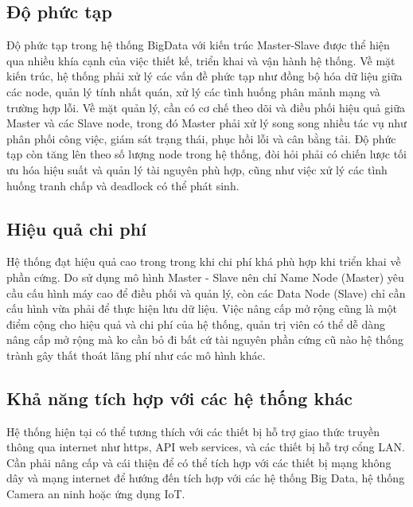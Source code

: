 \documentclass[../main.tex]{subfiles}
\begin{document}
\subsection{Độ phức tạp}
Độ phức tạp trong hệ thống BigData với kiến trúc Master-Slave được thể hiện qua nhiều khía cạnh của việc thiết kế, triển khai và vận hành hệ thống. Về mặt kiến trúc, hệ thống phải xử lý các vấn đề phức tạp như đồng bộ hóa dữ liệu giữa các node, quản lý tính nhất quán, xử lý các tình huống phân mảnh mạng và trường hợp lỗi. Về mặt quản lý, cần có cơ chế theo dõi và điều phối hiệu quả giữa Master và các Slave node, trong đó Master phải xử lý song song nhiều tác vụ như phân phối công việc, giám sát trạng thái, phục hồi lỗi và cân bằng tải. Độ phức tạp còn tăng lên theo số lượng node trong hệ thống, đòi hỏi phải có chiến lược tối ưu hóa hiệu suất và quản lý tài nguyên phù hợp, cũng như việc xử lý các tình huống tranh chấp và deadlock có thể phát sinh.
\subsection{Hiệu quả chi phí}
Hệ thống đạt hiệu quả cao trong trong khi chi phí khá phù hợp khi triển khai về phần cứng. Do sử dụng mô hình Master - Slave nên chỉ Name Node (Master) yêu cầu cấu hình máy cao để điều phối và quản lý, còn các Data Node (Slave) chỉ cần cấu hình vừa phải để thực hiện lưu dữ liệu. Việc nâng cấp mở rộng cũng là một điểm cộng cho hiệu quả và chi phí của hệ thống, quản trị viên có thể dễ dàng nâng cấp mở rộng mà ko cần bỏ đi bất cứ tài nguyên phần cứng cũ nào hệ thống trành gây thất thoát lãng phí như các mô hình khác. 

\subsection{Khả năng tích hợp với các hệ thống khác}
Hệ thống hiện tại có thể tương thích với các thiết bị hỗ trợ giao thức truyền thông qua internet như https, API web services, và các thiết bị hỗ trợ cổng LAN. Cần phải nâng cấp và cái thiện để có thể tích hợp với các thiết bị mạng không dây và mạng internet để hướng đến tích hợp với các hệ thống Big Data, hệ thống Camera an ninh hoặc ứng dụng IoT.
\end{document}
